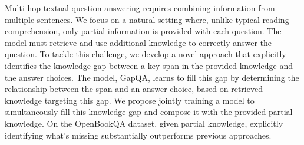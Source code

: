 Multi-hop textual question answering requires combining information from multiple sentences. We focus on a natural setting where, unlike typical reading comprehension, only partial information is provided with each question. The model must retrieve and use additional knowledge to correctly answer the question. To tackle this challenge, we develop a novel approach that explicitly identifies the knowledge gap between a key span in the provided knowledge and the answer choices. The model, GapQA, learns to fill this gap by determining the relationship between the span and an answer choice, based on retrieved knowledge targeting this gap. We propose jointly training a model to simultaneously fill this knowledge gap and compose it with the provided partial knowledge. On the OpenBookQA dataset, given partial knowledge, explicitly identifying what's missing substantially outperforms previous approaches.